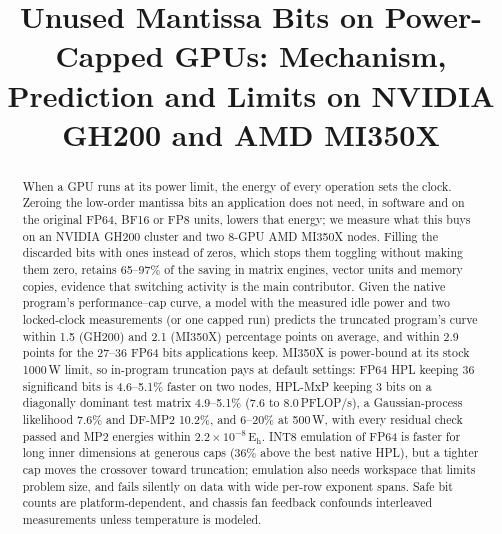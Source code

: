 \documentclass[conference]{IEEEtran}
\newcommand{\W}{\,W}
\newcommand{\Eh}{\,E$_\mathrm{h}$}
\newcommand{\ee}[2]{#1{\times}10^{#2}}  %
\newcommand{\pct}{\%}
\begin{document}

\title{Unused Mantissa Bits on Power-Capped GPUs: Mechanism, Prediction and Limits on NVIDIA GH200 and AMD MI350X}

\author{
}

\maketitle

\begin{abstract}
When a GPU runs at its power limit, the energy of every operation sets the clock. Zeroing the low-order mantissa bits an
application does not need, in software and on the original FP64, BF16 or FP8 units, lowers that energy; we measure what
this buys on an NVIDIA GH200 cluster and two 8-GPU AMD MI350X nodes. Filling the discarded bits with ones instead of
zeros, which stops them toggling without making them zero, retains 65--97\pct{} of the saving in matrix engines, vector
units and memory copies, evidence that switching activity is the main contributor. Given the native program's
performance--cap curve, a model with the measured idle power and two locked-clock measurements (or one capped run)
predicts the truncated program's curve within 1.5 (GH200) and 2.1 (MI350X) percentage points on average, and within 2.9
points for the 27--36 FP64 bits applications keep. MI350X is power-bound at its stock 1000\W{} limit, so in-program
truncation pays at default settings: FP64 HPL keeping 36 significand bits is 4.6--5.1\pct{} faster on two nodes,
HPL-MxP keeping 3 bits on a diagonally dominant test matrix 4.9--5.1\pct{} (7.6 to 8.0\,PFLOP/s), a Gaussian-process
likelihood 7.6\pct{} and DF-MP2 10.2\pct, and 6--20\pct{} at 500\W, with every residual check passed and MP2 energies
within $\ee{2.2}{-8}$\Eh. INT8 emulation of FP64 is faster for long inner dimensions at generous caps (36\pct{} above the
best native HPL), but a tighter cap moves the crossover toward truncation; emulation also needs workspace that limits
problem size, and fails silently on data with wide per-row exponent spans. Safe bit counts are platform-dependent, and
chassis fan feedback confounds interleaved measurements unless temperature is modeled.
\end{abstract}
\end{document}
